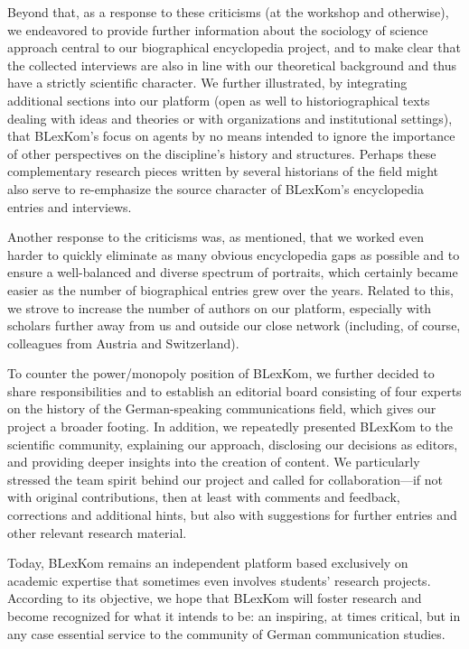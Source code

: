 \documentclass{tufte-handout}
\begin{document}
Beyond that, as a response to these criticisms (at the workshop and
otherwise), we endeavored to provide further information about the
sociology of science approach central to our biographical encyclopedia
project, and to make clear that the collected interviews are also in
line with our theoretical background and thus have a strictly scientific
character. We further illustrated, by integrating additional sections
into our platform (open as well to historiographical texts dealing with
ideas and theories or with organizations and institutional settings),
that BLexKom's focus on agents by no means intended to ignore the
importance of other perspectives on the discipline's history and
structures. Perhaps these complementary research pieces written by
several historians of the field might also serve to re-emphasize the
source character of BLexKom's encyclopedia entries and interviews.

Another response to the criticisms was, as mentioned, that we worked
even harder to quickly eliminate as many obvious encyclopedia gaps as
possible and to ensure a well-balanced and diverse spectrum of
portraits, which certainly became easier as the number of biographical
entries grew over the years. Related to this, we strove to increase the
number of authors on our platform, especially with scholars further away
from us and outside our close network (including, of course, colleagues
from Austria and Switzerland).

To counter the power/monopoly position of BLexKom, we further decided to
share responsibilities and to establish an editorial board consisting of
four experts on the history of the German-speaking communications field,
which gives our project a broader footing. In addition, we repeatedly
presented BLexKom to the scientific community, explaining our approach,
disclosing our decisions as editors, and providing deeper insights into
the creation of content. We particularly stressed the team spirit behind
our project and called for collaboration---if not with original
contributions, then at least with comments and feedback, corrections and
additional hints, but also with suggestions for further entries and
other relevant research material.

Today, BLexKom remains an independent platform based exclusively on
academic expertise that sometimes even involves students' research
projects. According to its objective, we hope that BLexKom will foster
research and become recognized for what it intends to be: an inspiring,
at times critical, but in any case essential service to the community of
German communication studies.
\end{document}
